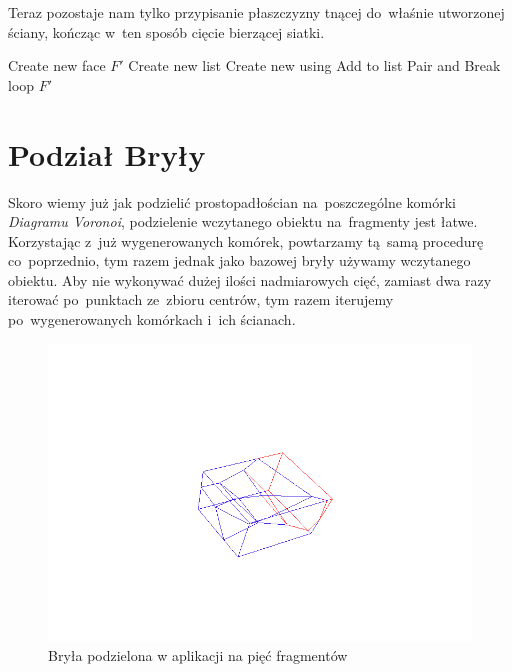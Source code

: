 \documentclass[skorowidz,autorrok,backref,xodstep,oswiadczenie]{wmimgr}
\begin{document}
Teraz pozostaje nam tylko przypisanie płaszczyzny tnącej do~właśnie utworzonej ściany, kończąc w~ten sposób cięcie bierzącej siatki.

\begin{algorithm}
\caption{$BuildCutFace(V, P)$}
\label{BuildCutFace}
\begin{algorithmic}
    \STATE Create new face $F'$
    \STATE Create new list 
        \STATE Create new  using 
        \STATE Add  to list 
                \STATE Pair  and 
                \STATE Break loop
            \ENDIF
        \ENDFOR
    \ENDFOR
        \STATE {}
    \ENDFOR
    \STATE {}
    \RETURN $F'$
\end{algorithmic}
\end{algorithm}

\section{Podział Bryły}

Skoro wiemy już jak podzielić prostopadłościan na~poszczególne komórki \emph{Diagramu Voronoi}, podzielenie wczytanego obiektu na~fragmenty jest łatwe. Korzystając z~już wygenerowanych komórek, powtarzamy tą~samą procedurę co~poprzednio, tym razem jednak jako bazowej bryły używamy wczytanego obiektu. Aby nie wykonywać dużej ilości nadmiarowych cięć, zamiast dwa razy iterować po~punktach ze~zbioru centrów, tym razem iterujemy po~wygenerowanych komórkach i~ich ścianach.

\begin{figure}[ht!]
\centering
\includegraphics[width=140mm]{images/app3_1.png}
\caption{Bryła podzielona w aplikacji na pięć fragmentów}
\label{newpointposition}
\end{figure}
\end{document}

